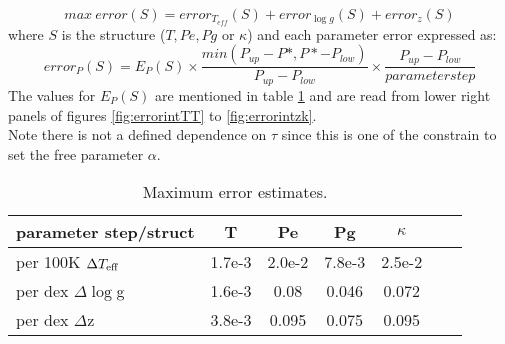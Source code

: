 \documentclass[11pt]{article}
\begin{document}
\begin{displaymath}
max~error(S) = error_{T_{eff}}(S) + error_{\log g}(S) + error_z(S)
\end{displaymath}
where $S$ is the structure ($T, Pe, Pg$ or $\kappa$) and each parameter error expressed as:
\begin{displaymath}
error_P(S) = E_P(S) \times \frac{min(P_{up}-P*,P*-P_{low})}{P_{up}-P_{low}} \times \frac{P_{up}-P_{low}}{parameter step}
\end{displaymath}
The values  for $E_P(S)$ are mentioned in table \ref{tab:error} and are read from lower right panels of figures \ref{fig:errorintTT} to \ref{fig:errorintzk}.\\
Note there is not a defined dependence on $\tau$ since this is one of the constrain to set the free parameter $\alpha$.\\

 \begin{table}[!h]
\begin{center}
\begin{tabular}{l|c|c|c|c|c|c}
parameter step/struct               & T            & Pe         &     Pg       &   $\kappa$ \\
\hline 
per 100K $\Delta T\rm_{eff}$   &  1.7e-3      &  2.0e-2     &  7.8e-3      &   2.5e-2         \\ 
per dex $\Delta \log$g         &  1.6e-3      &  0.08       &  0.046       &   0.072           \\
per dex $\Delta$z              &  3.8e-3     &   0.095      &   0.075       &   0.095           \\
 \end{tabular}
\end{center}
\caption{Maximum error estimates.}\label{tab:error}
\end{table}
\end{document}
